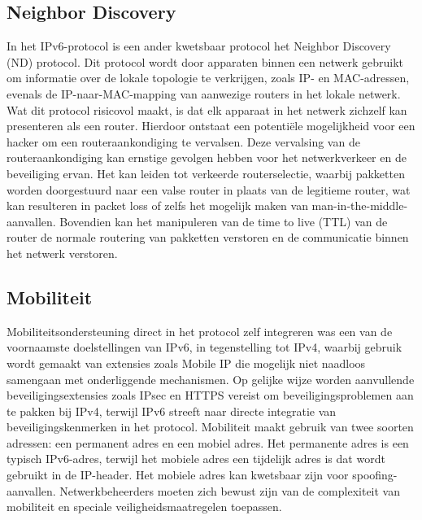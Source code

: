 \subsection{Neighbor Discovery}
In het IPv6-protocol is een ander kwetsbaar protocol het Neighbor Discovery (ND) protocol. Dit protocol wordt door apparaten binnen een netwerk gebruikt om informatie over de lokale topologie te verkrijgen, zoals IP- en MAC-adressen, evenals de IP-naar-MAC-mapping van aanwezige routers in het lokale netwerk. \autocite{nikander2004ipv6} Wat dit protocol risicovol maakt, is dat elk apparaat in het netwerk zichzelf kan presenteren als een router. \autocite{ullrich2014ipv6} Hierdoor ontstaat een potentiële mogelijkheid voor een hacker om een routeraankondiging te vervalsen. Deze vervalsing van de routeraankondiging kan ernstige gevolgen hebben voor het netwerkverkeer en de beveiliging ervan. Het kan leiden tot verkeerde routerselectie, waarbij pakketten worden doorgestuurd naar een valse router in plaats van de legitieme router, wat kan resulteren in packet loss of zelfs het mogelijk maken van man-in-the-middle-aanvallen. Bovendien kan het manipuleren van de time to live (TTL) van de router de normale routering van pakketten verstoren en de communicatie binnen het netwerk verstoren.


\subsection{Mobiliteit}
Mobiliteitsondersteuning direct in het protocol zelf integreren was een van de voornaamste doelstellingen van IPv6, in tegenstelling tot IPv4, waarbij gebruik wordt gemaakt van extensies zoals Mobile IP die mogelijk niet naadloos samengaan met onderliggende mechanismen.\autocite{ELGOARANY200732} Op gelijke wijze worden aanvullende beveiligingsextensies zoals IPsec en HTTPS vereist om beveiligingsproblemen aan te pakken bij IPv4, terwijl IPv6 streeft naar directe integratie van beveiligingskenmerken in het protocol.\autocite{sotillo2006ipv6} Mobiliteit maakt gebruik van twee soorten adressen: een permanent adres en een mobiel adres. Het permanente adres is een typisch IPv6-adres, terwijl het mobiele adres een tijdelijk adres is dat wordt gebruikt in de IP-header. Het mobiele adres kan kwetsbaar zijn voor spoofing-aanvallen. Netwerkbeheerders moeten zich bewust zijn van de complexiteit van mobiliteit en speciale veiligheidsmaatregelen toepassen.




\section{}%
\label{sec:De weg naar IPv6?}

